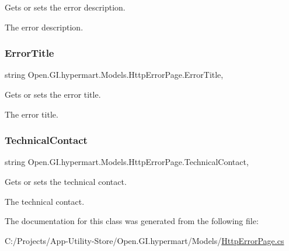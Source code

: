 Gets or sets the error description. 

The error description. \hypertarget{class_open_1_1_g_i_1_1hypermart_1_1_models_1_1_http_error_page_a5b8d76394892e084e31faf6781f88d61}{}\label{class_open_1_1_g_i_1_1hypermart_1_1_models_1_1_http_error_page_a5b8d76394892e084e31faf6781f88d61} 
\subsubsection{\texorpdfstring{Error\+Title}{ErrorTitle}}
{\footnotesize\ttfamily string Open.\+G\+I.\+hypermart.\+Models.\+Http\+Error\+Page.\+Error\+Title\hspace{0.3cm}{\ttfamily [get]}, {\ttfamily [set]}}



Gets or sets the error title. 

The error title. \hypertarget{class_open_1_1_g_i_1_1hypermart_1_1_models_1_1_http_error_page_a0db493a849f0b8a35064d1c48e736cec}{}\label{class_open_1_1_g_i_1_1hypermart_1_1_models_1_1_http_error_page_a0db493a849f0b8a35064d1c48e736cec} 
\subsubsection{\texorpdfstring{Technical\+Contact}{TechnicalContact}}
{\footnotesize\ttfamily string Open.\+G\+I.\+hypermart.\+Models.\+Http\+Error\+Page.\+Technical\+Contact\hspace{0.3cm}{\ttfamily [get]}, {\ttfamily [set]}}



Gets or sets the technical contact. 

The technical contact. 

The documentation for this class was generated from the following file\+:\begin{DoxyCompactItemize}
\item 
C\+:/\+Projects/\+App-\/\+Utility-\/\+Store/\+Open.\+G\+I.\+hypermart/\+Models/\hyperlink{_http_error_page_8cs}{Http\+Error\+Page.\+cs}\end{DoxyCompactItemize}
